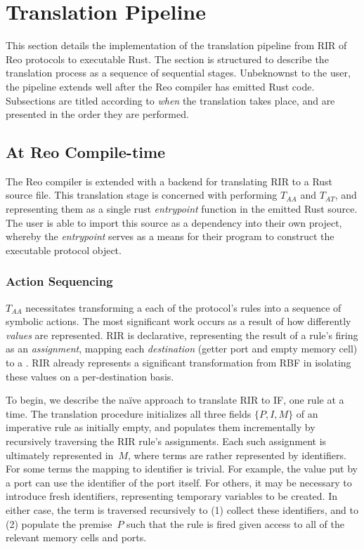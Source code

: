 \section{Translation Pipeline}
\label{sec:translation_pipeline}
This section details the implementation of the translation pipeline from RIR of Reo protocols to executable Rust. The section is structured to describe the translation process as a sequence of sequential stages. Unbeknownst to the user, the pipeline extends well after the Reo compiler has emitted Rust code. Subsections are titled according to \textit{when} the translation takes place, and are presented in the order they are performed.

\subsection{At Reo Compile-time}
\label{sec:translation_phase_1}
The Reo compiler is extended with a backend for translating RIR to a Rust source file. This translation stage is concerned with performing $T_{AA}$ and $T_{AT}$, and representing them as a single rust \textit{entrypoint} function in the emitted Rust source. The user is able to import this source as a dependency into their own project, whereby the \textit{entrypoint} serves as a means for their program to construct the executable protocol object.

\subsubsection{Action Sequencing}
$T_{AA}$ necessitates transforming a each of the protocol's rules into a sequence of symbolic actions. The most significant work occurs as a result of how differently \textit{values} are represented. RIR is declarative, representing the result of a rule's firing as an \textit{assignment}, mapping each \textit{destination} (getter port and empty memory cell) to a . RIR already represents a significant transformation from RBF in isolating these values on a per-destination basis. 

To begin, we describe the na\"ive approach to translate RIR to IF, one rule at a time. The translation procedure initializes all three fields $\{P, I, M\}$ of an imperative rule as initially empty, and populates them incrementally by recursively traversing the RIR rule's assignments. Each such assignment is ultimately represented in~$M$, where terms are rather represented by identifiers. For some terms the mapping to identifier is trivial. For example, the value put by a port can use the identifier of the port itself. For others, it may be necessary to introduce fresh identifiers, representing temporary variables to be created. In either case, the term is traversed recursively to (1) collect these identifiers, and to (2) populate the premise~$P$ such that the rule is fired given access to all of the relevant memory cells and ports.

